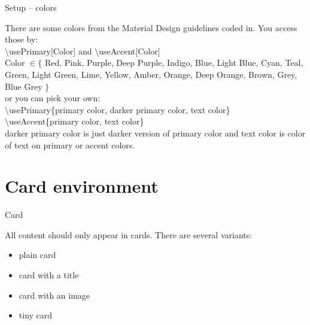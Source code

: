 \documentclass[aspectratio=1610,dvipsnames, noamsthm]{beamer}
\begin{document}
\usePrimaryCyan
\useAccentTeal



\begin{frame}{Setup -- colors}
  \begin{card}
    There are some colors from the Material Design guidelines coded in. You access those by: \\[2mm]
    {\color{accent} \textbackslash usePrimary[Color]} and {\color{accent}\textbackslash useAccent[Color]}\\[2mm]
    {\tiny {\color{accent}Color} $\in \{$ Red, Pink, Purple, Deep Purple, Indigo, Blue, Light Blue, Cyan, Teal, Green, Light Green, Lime, Yellow, Amber, Orange, Deep Orange, Brown, Grey, Blue Grey $\}$} \\[2mm]
    or you can pick your own:\\[2mm]
    {\color{accent} \textbackslash usePrimary\{primary color, darker primary color, text color\}}
    {\color{accent} \textbackslash useAccent\{primary color, text color\}}\\[2mm]
    {\color{accent} darker primary color} is just darker version of {\color{accent} primary color} and {\color{accent} text color} is color of text on {\color{accent} primary} or {\color{accent} accent colors}.
  \end{card}
\end{frame}







\usePrimaryLightGreen
\useAccentCyan




\section{Card environment}
\begin{frame}{Card}
  \begin{card}
    All content should only appear in cards. There are several variants:
    \begin{itemize}
      \item plain card
      \item card with a title
      \item card with an image
      \item tiny card
    \end{itemize}
  \end{card}
\end{frame}
\end{document}
